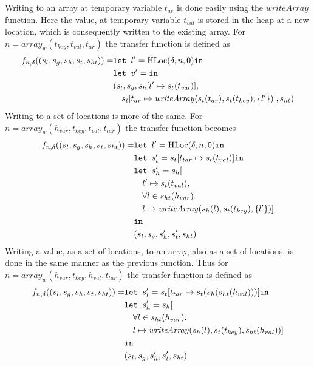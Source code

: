 Writing to an array at temporary variable $t_{ar}$ is done easily using the $\mathit{writeArray}$ function. Here the value, at temporary variable $t_{val}$ is stored in the heap at a new location, which is consequently written to the existing array. For $n = \mathit{array}_w(t_{key},t_{val},t_{ar})$ the transfer function is defined as
\begin{align}
f_{n,\delta}((s_l, s_g, s_h, s_t, s_{ht})) = & \texttt{let } l' = \text{HLoc}(\delta, n, 0) \texttt{in }\notag\\
                            & \texttt{let } v' =  \texttt{in }\notag\\
                            &(s_l, s_g, s_h[l'\mapsto s_t(t_{val})], \notag\\
                            &\quad s_t[t_{ar} \mapsto \mathit{writeArray}(s_t(t_{ar}), s_t(t_{key}), \{l'\})], s_{ht})
\end{align}
Writing to a set of locations is more of the same. For $n = \mathit{array}_w(h_{var}, t_{key},t_{val},t_{tar})$ the transfer function becomes
\begin{align}
f_{n,\delta}((s_l, s_g, s_h, s_t, s_{ht})) = &\texttt{let } l' = \text{HLoc}(\delta, n, 0) \texttt{in } \notag\\
                            &\texttt{let } s_t' = s_t[t_{tar}\mapsto s_t(t_{val})] \texttt{in }\notag\\
                            &\texttt{let } s_h' = s_h[\notag\\
                            &\quad l' \mapsto s_t(t_{val}), \notag\\
                            &\quad \forall l \in s_{ht}(h_{var}).\notag\\
                            &\quad l\mapsto \mathit{writeArray}(s_h(l), s_t(t_{key}), \{l'\})]\notag\\
                            & \texttt{in }\notag\\
                            &(s_l, s_g, s_h', s_t', s_{ht})
\end{align}
Writing a value, as a set of locations, to an array, also as a set of locations, is done in the same manner as the previous function. Thus for  $n = \mathit{array}_w(h_{var}, t_{key},h_{val},t_{tar})$ the transfer function is defined as 
\begin{align}
    f_{n,\delta}((s_l, s_g, s_h, s_t, s_{ht})) = &\texttt{let } s_t' = s_t[t_{tar}\mapsto s_t(s_h(s_{ht}(h_{val})))] \texttt{in }\notag\\
                              &\texttt{let } s_h' = s_h[\notag\\
                              &\quad \forall l \in s_{ht}(h_{var}).\notag\\
                              &\quad l\mapsto \mathit{writeArray}(s_h(l), s_t(t_{key}), s_{ht}(h_{val}))]\notag\\
                              & \texttt{in }\notag\\
                              &(s_l, s_g, s_h', s_t', s_{ht})
\end{align}

